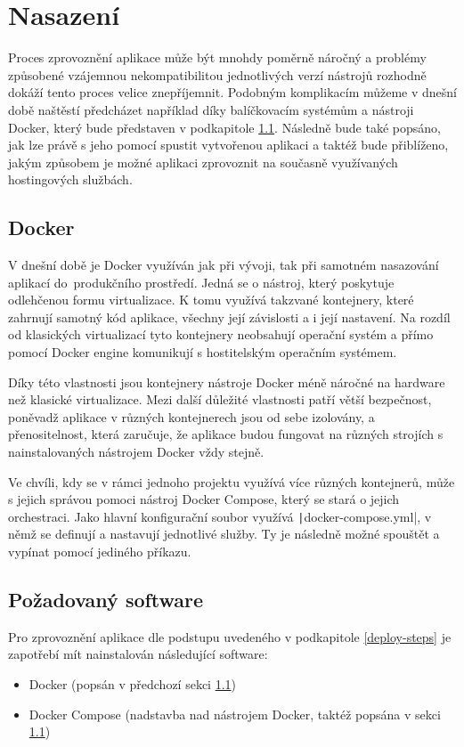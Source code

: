 \chapter{Nasazení}
Proces zprovoznění aplikace může být mnohdy poměrně náročný a problémy způsobené vzájemnou nekompatibilitou jednotlivých verzí nástrojů rozhodně dokáží tento proces velice znepříjemnit. Podobným komplikacím můžeme v dnešní době naštěstí předcházet například díky balíčkovacím systémům a nástroji Docker, který bude představen v podkapitole \ref{docker}. Následně bude také popsáno, jak lze právě s jeho pomocí spustit vytvořenou aplikaci a taktéž bude přiblíženo, jakým způsobem je možné aplikaci zprovoznit na současně využívaných hostingových službách.

\section{Docker}\label{docker}
V dnešní době je Docker využíván jak při vývoji, tak při samotném nasazování aplikací do~produkčního prostředí. Jedná se o nástroj, který poskytuje odlehčenou formu virtualizace. K tomu využívá takzvané kontejnery, které zahrnují samotný kód aplikace, všechny její závislosti a i její nastavení. Na rozdíl od klasických virtualizací tyto kontejnery neobsahují operační systém a přímo pomocí Docker engine komunikují s hostitelským operačním systémem.

Díky této vlastnosti jsou kontejnery nástroje Docker méně náročné na hardware než klasické virtualizace. Mezi další důležité vlastnosti patří větší bezpečnost, poněvadž aplikace v různých kontejnerech jsou od sebe izolovány, a přenositelnost, která zaručuje, že aplikace budou fungovat na různých strojích s nainstalovaných nástrojem Docker vždy stejně.

Ve chvíli, kdy se v rámci jednoho projektu využívá více různých kontejnerů, může s jejich správou pomoci nástroj Docker Compose, který se stará o jejich orchestraci. Jako hlavní konfigurační soubor využívá \texttt|docker-compose.yml|, v němž se definují a nastavují jednotlivé služby. Ty je následně možné spouštět a vypínat pomocí jediného příkazu.

\section{Požadovaný software}
Pro zprovoznění aplikace dle podstupu uvedeného v podkapitole \ref{deploy-steps} je zapotřebí mít nainstalován následující software:
\begin{itemize}
	\item Docker (popsán v předchozí sekci \ref{docker})
	\item Docker Compose (nadstavba nad nástrojem Docker, taktéž popsána v sekci \ref{docker})
\end{itemize}

